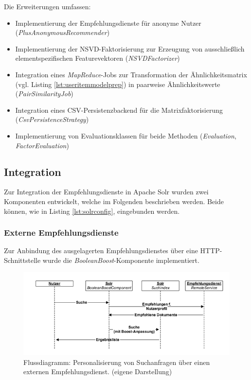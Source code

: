 Die Erweiterungen umfassen:
\begin{itemize}
\item Implementierung der Empfehlungsdienste für anonyme Nutzer (\textit{PlusAnonymousRecommender})
\item Implementierung der NSVD-Faktorisierung zur Erzeugung von ausschließlich elementspezifischen Featurevektoren (\textit{NSVDFactorizer})
\item Integration eines \textit{MapReduce}-Jobs zur Transformation der Ähnlichkeitsmatrix (vgl. Listing \ref{lst:useritemmodelprep}) in paarweise Ähnlichkeitswerte (\textit{PairSimilarityJob})
\item Integration eines CSV-Persistenzbackend für die Matrixfaktorisierung (\textit{CsvPersistenceStrategy})
\item Implementierung von Evaluationsklassen für beide Methoden (\textit{Evaluation}, \textit{FactorEvaluation})
\end{itemize}

\subsection{Integration}

Zur Integration der Empfehlungsdienste in Apache Solr wurden zwei Komponenten entwickelt, welche im Folgenden beschrieben werden. Beide können, wie in Listing \ref{lst:solrconfig}, eingebunden werden.

\subsubsection{Externe Empfehlungsdienste}\label{sec:external_impl}

Zur Anbindung des ausgelagerten Empfehlungsdienstes über eine HTTP-Schnittstelle wurde die \textit{BooleanBoost}-Komponente implementiert.
\begin{figure}[H]
  \centering
    \includegraphics[width=\textwidth]{Abbildungen/search-rec1.png}
    \caption[Flussdiagram - externe Empfehlungen]{\footnotesize Flussdiagramm: Personalisierung von Suchanfragen über einen externen Empfehlungsdienst. { \scriptsize (eigene Darstellung) }}
    \label{fig:seq-extern-recommender}
\end{figure}

